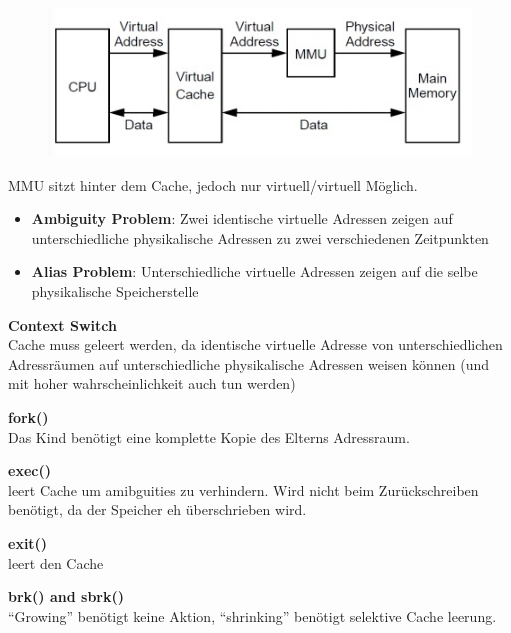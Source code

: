 \documentclass[a4paper]{scrreprt}
\begin{document}
\begin{figure}[ht]
\centering
\includegraphics[scale=0.4]{graphics/VIVT.png}
\end{figure}

MMU sitzt hinter dem Cache, jedoch nur virtuell/virtuell Möglich.

\begin{itemize}
\item \textbf{Ambiguity Problem}: Zwei identische virtuelle Adressen zeigen auf unterschiedliche physikalische Adressen zu zwei verschiedenen Zeitpunkten
\item \textbf{Alias Problem}: Unterschiedliche virtuelle Adressen zeigen auf die selbe physikalische Speicherstelle
\end{itemize}

\begin{description}
\item \textbf{Context Switch} \ \\ Cache muss geleert werden, da identische virtuelle Adresse von unterschiedlichen Adressräumen auf unterschiedliche physikalische Adressen weisen können (und mit hoher wahrscheinlichkeit auch tun werden)

\item \textbf{fork()} \ \\Das Kind benötigt eine komplette Kopie des Elterns Adressraum.
\item \textbf{exec()} \ \\ leert Cache um amibguities zu verhindern. Wird nicht beim Zurückschreiben benötigt, da der Speicher eh überschrieben wird.

\item \textbf{exit()} \ \\ leert den Cache
\item \textbf{brk() and sbrk()} \ \\ "`Growing"' benötigt keine Aktion, "`shrinking"' benötigt selektive Cache leerung.
\end{description}
\end{document}
